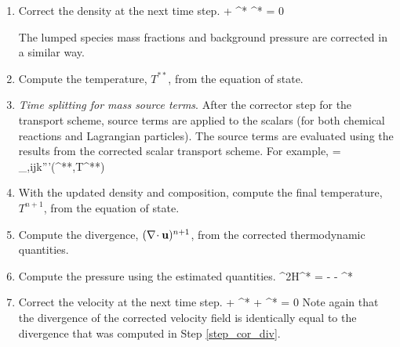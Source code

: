 \begin{enumerate}

\item Correct the density at the next time step.
\be
{} +  \nabla\!\cdot \rho^* \bu^* = 0
\ee

The lumped species mass fractions and background pressure are corrected in a similar way.

\item Compute the temperature, $T^{**}$, from the equation of state.

\item \emph{Time splitting for mass source terms}. After the corrector step for the transport scheme, source terms are applied to the scalars (for both chemical reactions and Lagrangian particles).  The source terms are evaluated using the results from the corrected scalar transport scheme.  For example,
\be
{} =  \dm_{\alpha,ijk}'''(^{**},T^{**})
\ee

\item With the updated density and composition, compute the final temperature, $T^{n+1}$, from the equation of state.

\item \label{step_cor_div} Compute the divergence, $(\nabla\!\cdot {\bf u})^{n+1}$, from the corrected thermodynamic quantities.

\item Compute the pressure using the estimated quantities.
\be
\label{eqn_corrector_poisson2}
\nabla^2{\cal H}^* = - 
   - \nabla\!\cdot {}^*
\ee

\item Correct the velocity at the next time step.
\be
{} + ^* + ^*  = 0
\ee
Note again that the divergence of the corrected velocity field is identically equal to the divergence that was computed in Step \ref{step_cor_div}.


\end{enumerate}
